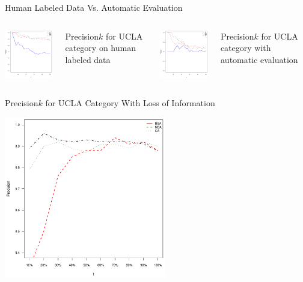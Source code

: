 \documentclass{beamer}
\begin{document}
\begin{frame}{Human Labeled Data Vs. Automatic Evaluation}
\begin{columns}[c]
\column{2in}
  \includegraphics[width=2in]{experiment/e1_ucla_pool.pdf}
  \begin{center}Precision\at$k$ for UCLA category on human labeled data\end{center}
\column{2in}
  \includegraphics[width=2in]{experiment/e1_ucla.pdf}
  \begin{center}Precision\at$k$ for UCLA category with automatic evaluation\end{center}
\end{columns}
\end{frame}

\begin{frame}{Precision\at$k$ for UCLA Category With Loss of Information}
\begin{center}
  \includegraphics[width=200pt]{experiment/e2_ucla.pdf}
\end{center}
\end{frame}
\end{document}
